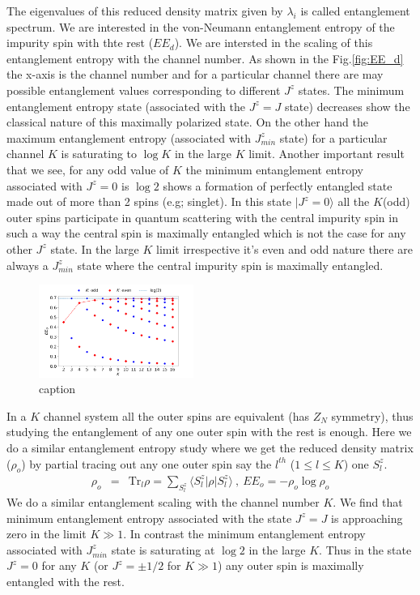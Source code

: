 \documentclass[reprint,prb,superscriptaddress]{revtex4-2}
\begin{document}
\noindent The eigenvalues of this reduced density matrix given by $\lambda_i$ is called entanglement spectrum. We are interested in the von-Neumann entanglement entropy of the impurity spin with thte rest ($EE_d$). We are intersted in the scaling of this entanglement entropy with the channel number. As shown in the Fig.\ref{fig:EE_d} the x-axis is the channel number and for a particular channel there are may possible entanglement values corresponding to different $J^z$ states. The minimum entanglement entropy state (associated with the $J^z=J$ state) decreases show the classical nature of this maximally polarized state. On the other hand the maximum entanglement entropy (associated with $J^z_{min}$ state) for a particular channel $K$ is saturating to $\log K$ in the large $K$ limit. Another important result that we see, for any odd value of $K$ the minimum entanglement entropy associated with $J^z=0$ is $\log 2$ shows a formation of perfectly entangled state made out of more than 2 spins (e.g; singlet). In this state $|J^z=0\rangle$ all the $K$(odd) outer spins participate in quantum scattering with the central impurity spin in such a way the central spin is maximally entangled which is not the case for any other $J^z$ state. In the large $K$ limit irrespective it's even and odd nature there are always a $J^z_{min}$ state where the central impurity spin is maximally entangled.
\begin{figure}[!htpb]
\centering
\includegraphics[width=0.45\textwidth]{plt/outer_EE_multi_channel_ANN.png}
\caption{caption}
\label{fig:EE_outer}
\end{figure}
In a $K$ channel system all the outer spins are equivalent (has $Z_N$ symmetry), thus studying the entanglement of any one outer spin with the rest is enough. Here we do a similar entanglement entropy study where we get the reduced density matrix ($\rho_o$) by partial tracing out any one outer spin say the $l^{th}$ ($1\leq l \leq K$) one $S^z_{l}$. 
\begin{eqnarray}
\rho_{o} &=& \textrm{Tr}_{l} \rho =\displaystyle\sum_{S^z_{l}} \langle S^z_l | \rho | S^z_{l} \rangle~,~EE_o=-\rho_{o}\log \rho_{o}
\end{eqnarray}
We do a similar entanglement scaling with the channel number $K$. We find that minimum entanglement entropy associated with the state $J^z=J$ is approaching zero in the limit $K\gg 1$. In contrast the minimum entanglement entropy associated with $J^z_{min}$ state is saturating at $\log 2$ in the large $K$. Thus in the state $J^z=0$ for any $K$ (or $J^z=\pm 1/2$ for $K\gg 1$) any outer spin is maximally entangled with the rest.
\end{document}
